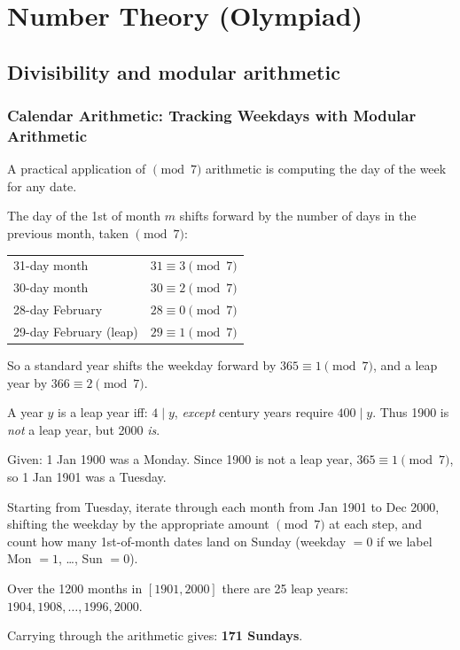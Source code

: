 
\section{Number Theory (Olympiad)}

\subsection{Divisibility and modular arithmetic}


\subsubsection*{Calendar Arithmetic: Tracking Weekdays with Modular Arithmetic}

A practical application of $\pmod{7}$ arithmetic is computing the day of the week for any date.

\begin{remark}
The day of the 1st of month $m$ shifts forward by the number of days in the previous month, taken $\pmod{7}$:
\begin{center}
\begin{tabular}{ll}
31-day month & $31 \equiv 3 \pmod{7}$ \\
30-day month & $30 \equiv 2 \pmod{7}$ \\
28-day February & $28 \equiv 0 \pmod{7}$ \\
29-day February (leap) & $29 \equiv 1 \pmod{7}$
\end{tabular}
\end{center}
So a standard year shifts the weekday forward by $365 \equiv 1 \pmod 7$, and a leap year by $366 \equiv 2 \pmod 7$.
\end{remark}

\begin{remark}
A year $y$ is a leap year iff: $4 \mid y$, \emph{except} century years require $400 \mid y$. Thus 1900 is \emph{not} a leap year, but 2000 \emph{is}.
\end{remark}

\begin{example}
Given: 1 Jan 1900 was a Monday. Since 1900 is not a leap year, $365 \equiv 1 \pmod 7$, so 1 Jan 1901 was a Tuesday.

Starting from Tuesday, iterate through each month from Jan 1901 to Dec 2000, shifting the weekday by the appropriate amount $\pmod 7$ at each step, and count how many 1st-of-month dates land on Sunday (weekday $= 0$ if we label Mon $= 1$, \ldots, Sun $= 0$).

Over the 1200 months in $[1901, 2000]$ there are 25 leap years: $1904, 1908, \ldots, 1996, 2000$.

Carrying through the arithmetic gives: \textbf{171 Sundays}.
\end{example}

